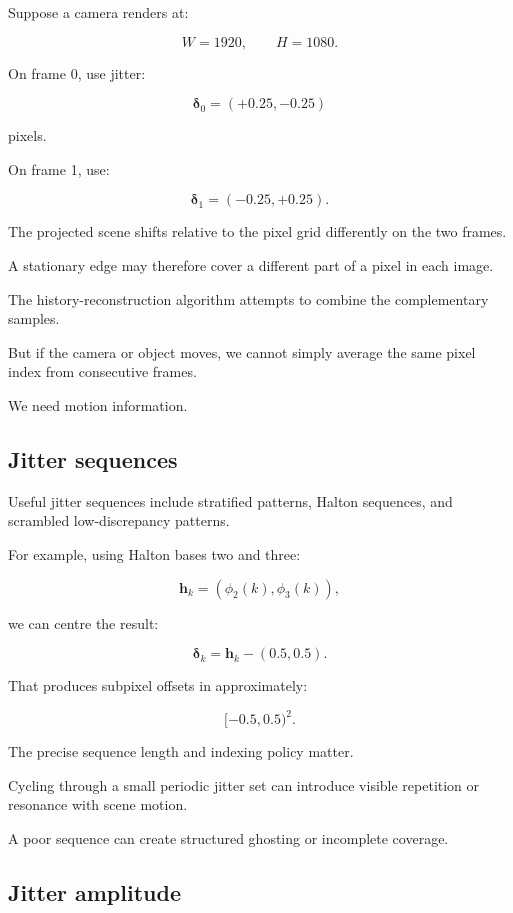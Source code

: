 \hypertarget{02-foundations-ii-ch036-a-simple-two-frame-jitter-example}{}

Suppose a camera renders at:

\[
 W=1920,\qquad H=1080.
\]

On frame 0, use jitter:

\[
 \boldsymbol\delta_0=(+0.25,-0.25)
\]

pixels.

On frame 1, use:

\[
 \boldsymbol\delta_1=(-0.25,+0.25).
\]

The projected scene shifts relative to the pixel grid differently on the two frames.

A stationary edge may therefore cover a different part of a pixel in each image.

The history-reconstruction algorithm attempts to combine the complementary samples.

But if the camera or object moves, we cannot simply average the same pixel index from consecutive frames.

We need motion information.

\subsection{Jitter sequences}\label{02-foundations-ii-ch036-jitter-sequences}

\hypertarget{02-foundations-ii-ch036-jitter-sequences}{}

Useful jitter sequences include stratified patterns, Halton sequences, and scrambled low-discrepancy patterns.

For example, using Halton bases two and three:

\[
 \mathbf h_k=(\phi_2(k),\phi_3(k)),
\]

we can centre the result:

\[
 \boxed{ \boldsymbol\delta_k= \mathbf h_k-(0.5,0.5) }.
\]

That produces subpixel offsets in approximately:

\[
 [-0.5,0.5)^2.
\]

The precise sequence length and indexing policy matter.

Cycling through a small periodic jitter set can introduce visible repetition or resonance with scene motion.

A poor sequence can create structured ghosting or incomplete coverage.

\subsection{Jitter amplitude}\label{02-foundations-ii-ch036-jitter-amplitude}

